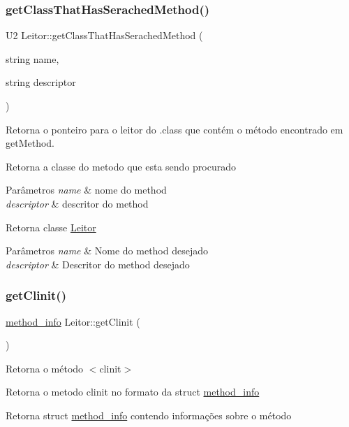 \subsubsection{\texorpdfstring{get\+Class\+That\+Has\+Serached\+Method()}{getClassThatHasSerachedMethod()}}
{\footnotesize\ttfamily U2 Leitor\+::get\+Class\+That\+Has\+Serached\+Method (\begin{DoxyParamCaption}\item[{string}]{name,  }\item[{string}]{descriptor }\end{DoxyParamCaption})}



Retorna o ponteiro para o leitor do .class que contém o método encontrado em get\+Method. 

Retorna a classe do metodo que esta sendo procurado 
\begin{DoxyParams}{Parâmetros}
{\em name} & nome do method \\
\hline
{\em descriptor} & descritor do method \\
\hline
\end{DoxyParams}
\begin{DoxyReturn}{Retorna}
classe \hyperlink{classLeitor}{Leitor}
\end{DoxyReturn}

\begin{DoxyParams}{Parâmetros}
{\em name} & Nome do method desejado \\
\hline
{\em descriptor} & Descritor do method desejado \\
\hline
\end{DoxyParams}
\mbox{\label{classLeitor_a4c64b307c9690ba25f04e911e07fe5a3}} 
\subsubsection{\texorpdfstring{get\+Clinit()}{getClinit()}}
{\footnotesize\ttfamily \hyperlink{structmethod__info}{method\+\_\+info} Leitor\+::get\+Clinit (\begin{DoxyParamCaption}{ }\end{DoxyParamCaption})}



Retorna o método $<$clinit$>$ 

Retorna o metodo clinit no formato da struct \hyperlink{structmethod__info}{method\+\_\+info} \begin{DoxyReturn}{Retorna}
struct \hyperlink{structmethod__info}{method\+\_\+info} contendo informações sobre o método 
\end{DoxyReturn}
\mbox{\label{classLeitor_a95bd2e9979122b1d742ce2e0dd6c4a4b}} 
